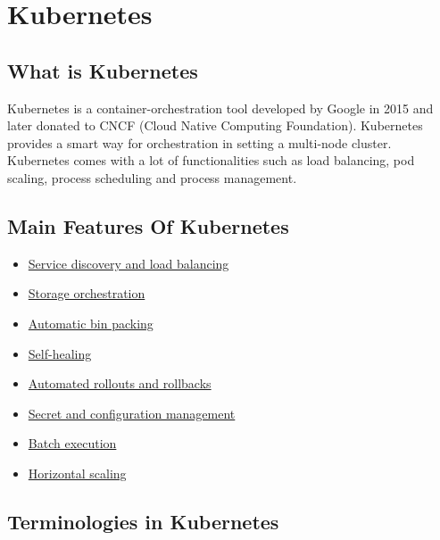 \documentclass[12pt]{report}
\begin{document}
\chapter{Kubernetes}
\section{What is Kubernetes}
Kubernetes is a container-orchestration tool developed by Google in 2015 and later donated to CNCF (Cloud Native Computing Foundation). Kubernetes provides a smart way for orchestration in setting a multi-node cluster. Kubernetes comes with a lot of functionalities such as load balancing, pod scaling, process scheduling and process management.\cite{Kubernetes}
\section{Main Features Of Kubernetes}
\begin{itemize}
	\item \href{https://kubernetes.io/docs/concepts/services-networking/service/}{Service discovery and load balancing}\cite{Kservice}
	\item \href{https://kubernetes.io/docs/concepts/storage/persistent-volumes/}{Storage orchestration}\cite{Kstorch}
	\item \href{https://kubernetes.io/docs/concepts/configuration/manage-compute-resources-container/}{Automatic bin packing}\cite{Kmanage}
	\item \href{https://kubernetes.io/docs/concepts/workloads/controllers/replicationcontroller/#how-a-replicationcontroller-works}{Self-healing}\cite{Kcontrol}
	\item \href{https://kubernetes.io/docs/concepts/workloads/controllers/deployment/}{Automated rollouts and rollbacks}\cite{Krollout}
	\item \href{https://kubernetes.io/docs/concepts/configuration/secret/}{Secret and configuration management}\cite{Kscmanage}
	\item \href{https://kubernetes.io/docs/concepts/workloads/controllers/jobs-run-to-completion/}{Batch execution}\cite{Kbe}
	\item \href{https://kubernetes.io/docs/tasks/run-application/horizontal-pod-autoscale/}{Horizontal scaling}\cite{Khs}
\end{itemize}
\section{Terminologies in Kubernetes}
\end{document}
